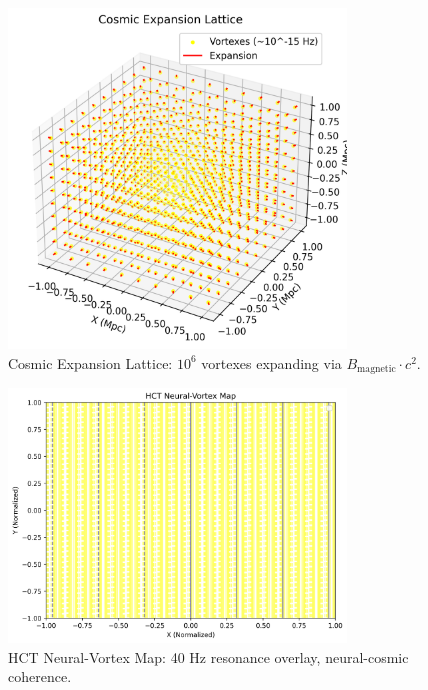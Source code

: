 \documentclass[a4paper,12pt]{article}
\begin{document}
\begin{figure}[h]
    \centering
    \includegraphics[width=0.8\textwidth]{figures/cosmic_expansion.png}
    \caption{Cosmic Expansion Lattice: \(10^6\) vortexes expanding via \(B_{\text{magnetic}} \cdot c^2\).}
    \label{fig:cosmic_expansion}
\end{figure}

\begin{figure}[h]
    \centering
    \includegraphics[width=0.8\textwidth]{figures/neural_vortex.png}
    \caption{HCT Neural-Vortex Map: 40 Hz resonance overlay, neural-cosmic coherence.}
    \label{fig:neural_vortex}
\end{figure}
\end{document}

